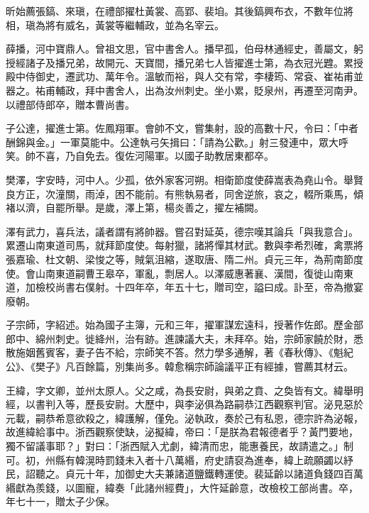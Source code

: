 \begin{pinyinscope}
 昕始薦張鎬、來瑱，在禮部擢杜黃裳、高郢、裴垍。其後鎬興布衣，不數年位將相，瑱為將有威名，黃裳等繼輔政，並為名宰云。



 薛播，河中寶鼎人。曾祖文思，官中書舍人。播早孤，伯母林通經史，善屬文，躬授經諸子及播兄弟，故開元、天寶間，播兄弟七人皆擢進士第，為衣冠光韙。累授殿中侍御史，遷武功、萬年令。溫敏而裕，與人交有常，李棲筠、常袞、崔祐甫並器之。祐甫輔政，拜中書舍人，出為汝州刺史。坐小累，貶泉州，再遷至河南尹。以禮部侍郎卒，贈本曹尚書。



 子公達，擢進士第。佐鳳翔軍。會帥不文，嘗集射，設的高數十尺，令曰：「中者酬錦與金。」一軍莫能中。公達執弓矢揖曰：「請為公歡。」射三發連中，眾大呼笑。帥不喜，乃自免去。復佐河陽軍。以國子助教居東都卒。



 樊澤，字安時，河中人。少孤，依外家客河朔。相衛節度使薛嵩表為堯山令。舉賢良方正，次潼關，雨淖，困不能前。有熊執易者，同舍逆旅，哀之，輟所乘馬，傾褚以濟，自罷所舉。是歲，澤上第，楊炎善之，擢左補闕。



 澤有武力，喜兵法，議者謂有將帥器。嘗召對延英，德宗嘆其論兵「與我意合」。累遷山南東道司馬，就拜節度使。每射獵，諸將憚其材武。數與李希烈確，禽票將張嘉瑜、杜文朝、梁悛之等，賊氣沮縮，遂取唐、隋二州。貞元三年，為荊南節度使。會山南東道嗣曹王皋卒，軍亂，剽居人。以澤威惠著襄、漢間，復徙山南東道，加檢校尚書右僕射。十四年卒，年五十七，贈司空，謚曰成。訃至，帝為撤宴廢朝。



 子宗師，字紹述。始為國子主簿，元和三年，擢軍謀宏遠科，授著作佐郎。歷金部郎中、綿州刺史。徙絳州，治有跡。進諫議大夫，未拜卒。始，宗師家饒於財，悉散施姻舊賓客，妻子告不給，宗師笑不答。然力學多通解，著《春秋傳》、《魁紀公》、《樊子》凡百餘篇，別集尚多。韓愈稱宗師論議平正有經據，嘗薦其材云。



 王緯，字文卿，並州太原人。父之咸，為長安尉，與弟之賁、之奐皆有文。緯舉明經，以書判入等，歷長安尉。大歷中，與李泌俱為路嗣恭江西觀察判官。泌見惡於元載，嗣恭希意欲殺之，緯護解，僅免。泌執政，奏於己有私恩，德宗許為泌報，故進緯給事中。浙西觀察使缺，泌擬緯，帝曰：「是朕為君報德者乎？黃門要地，獨不留議事耶？」對曰：「浙西賦入尤劇，緯清而忠，能惠養民，故請遣之。」制可。初，州縣有韓滉時罰錢未入者十八萬緡，府史請裒為進奉，緯上疏願蠲以紓民，詔聽之。貞元十年，加御史大夫兼諸道鹽鐵轉運使。裴延齡以諸道負錢四百萬緡獻為羨錢，以圖寵，緯奏「此諸州經費」，大忤延齡意，改檢校工部尚書。卒，年七十一，贈太子少保。




\end{pinyinscope}
